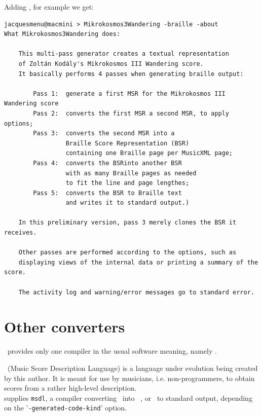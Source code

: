 Adding , for example we get:
\begin{lstlisting}[language=Terminal]
jacquesmenu@macmini > Mikrokosmos3Wandering -braille -about
What Mikrokosmos3Wandering does:

    This multi-pass generator creates a textual representation
    of Zoltán Kodály's Mikrokosmos III Wandering score.
    It basically performs 4 passes when generating braille output:

        Pass 1:  generate a first MSR for the Mikrokosmos III Wandering score
        Pass 2:  converts the first MSR a second MSR, to apply options;
        Pass 3:  converts the second MSR into a
                 Braille Score Representation (BSR)
                 containing one Braille page per MusicXML page;
        Pass 4:  converts the BSRinto another BSR
                 with as many Braille pages as needed
                 to fit the line and page lengthes;
        Pass 5:  converts the BSR to Braille text
                 and writes it to standard output.)

    In this preliminary version, pass 3 merely clones the BSR it receives.

    Other passes are performed according to the options, such as
    displaying views of the internal data or printing a summary of the score.

    The activity log and warning/error messages go to standard error.
\end{lstlisting}


\section{Other converters}\label{Other converters}

\mf\ provides only one compiler in the usual software meaning, namely \msdlconverter.

\msdlLang\ (Music Score Description Language) is a language under evolution being created by this author. It is meant for use by musicians, i.e. non-programmers, to obtain scores from a rather high-level description.\\
\mf supplies {\tt msdl}, a compiler converting \msdlLang\ into \guido\, \lily, \braille or \mxml\ to standard output, depending on the '{\tt -generated-code-kind}' option.


